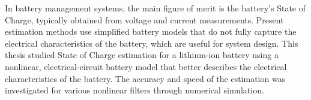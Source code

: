 In battery management systems, the main figure of merit is the battery's State of Charge, typically obtained from voltage and current measurements.
Present estimation methods use simplified battery models that do not fully capture the electrical characteristics of the battery, which are useful for system design.
This thesis studied State of Charge estimation for a lithium-ion battery using a nonlinear, electrical-circuit battery model that better describes the electrical characteristics of the battery.
The accuracy and speed of the estimation was investigated for various nonlinear filters through numerical simulation.
